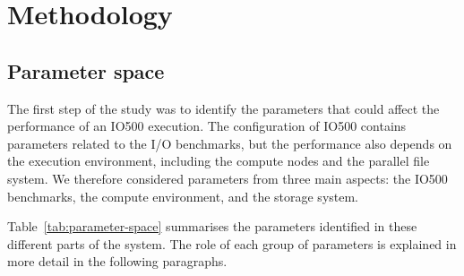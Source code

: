 \section{Methodology}
\label{sec:methodology}


\subsection{Parameter space}
\label{sec:parameter-space}

The first step of the study was to identify the parameters that could
affect the performance of an IO500 execution. The configuration of IO500
contains parameters related to the I/O benchmarks, but the performance
also depends on the execution environment, including the compute nodes
and the parallel file system. We therefore considered parameters from
three main aspects: the IO500 benchmarks, the compute environment, and the
storage system.


Table~\ref{tab:parameter-space} summarises the parameters identified in
these different parts of the system. The role of each group of parameters
is explained in more detail in the following paragraphs.

